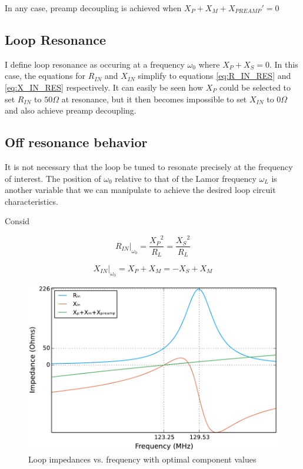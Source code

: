 In any case, preamp decoupling is achieved when $X_P+X_M+{X_{PREAMP}}'=0$

\subsection{Loop Resonance}
I define loop resonance as occuring at a frequency $\omega_0$ where $X_P + X_S = 0$. In this case, the equations for $R_{IN}$ and $X_{IN}$ simplify to
equations \ref{eq:R_IN_RES} and \ref{eq:X_IN_RES} respectively. It can easily be seen how $X_P$ could be selected to set
$R_{IN}$ to $50\Omega$ at resonance, but it then becomes impossible to set $X_{IN}$ to $0\Omega$ and also achieve preamp decoupling.

\subsection{Off resonance behavior}
It is not necessary that the loop be tuned to resonate precisely at the frequency of interest. The position of
$\omega_0$ relative to that of the Lamor frequency $\omega_L$ is another variable that we can manipulate to achieve the
desired loop circuit characteristics.

Consid


\begin{equation} \label{eq:R_IN_RES}
    R_{IN}\big|_{\omega_0}=\frac{{X_P}^2}{R_L} = \frac{{X_S}^2}{R_L} 
\end{equation}

\begin{equation} \label{eq:X_IN_RES}
    X_{IN}\big|_{\omega_0}=X_P+X_M=-X_S+X_M
\end{equation}

\begin{figure}
    \includegraphics[width=6in]{figures/impedance_plot.pdf}
    \caption{Loop impedances vs. frequency with optimal component values}
    \label{fig:impedance_plot}
\end{figure}
